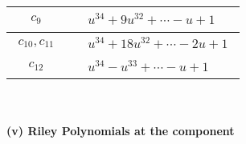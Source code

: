 \documentclass[1p]{elsarticle_modified}
\theoremstyle{definition}
\begin{document}
\begin{tabular}{m{50pt}|m{274pt}}
\hline $$\begin{aligned}c_{9}\end{aligned}$$&$\begin{aligned}
&u^{34}+9 u^{32}+\cdots- u+1
\end{aligned}$\\
\hline $$\begin{aligned}c_{10},c_{11}\end{aligned}$$&$\begin{aligned}
&u^{34}+18 u^{32}+\cdots-2 u+1
\end{aligned}$\\
\hline $$\begin{aligned}c_{12}\end{aligned}$$&$\begin{aligned}
&u^{34}- u^{33}+\cdots- u+1
\end{aligned}$\\
\hline
\end{tabular}\\~\\
\newpage\renewcommand{\arraystretch}{1}
\flushleft \textbf{(v) Riley Polynomials at the component}\newline \\
\end{document}
